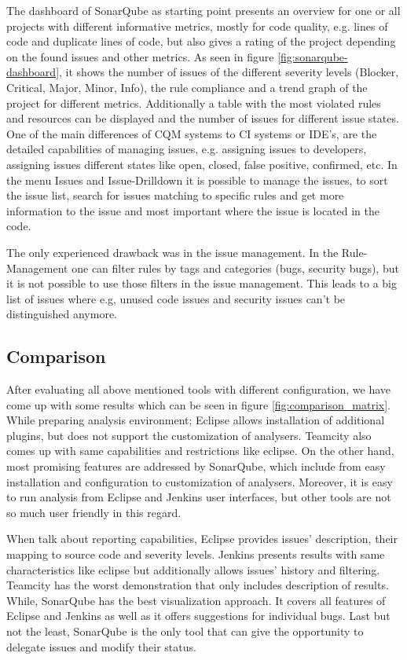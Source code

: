 \documentclass[conference]{IEEEtran}
\begin{document}
The dashboard of SonarQube as starting point presents an overview for one or all projects with different informative metrics, mostly for code quality, e.g. lines of code and duplicate lines of code, but also gives a rating of the project depending on the found issues and other metrics.
As seen in figure \ref{fig:sonarqube-dashboard}, it shows the number of issues of the different severity levels (Blocker, Critical, Major, Minor, Info), the rule compliance and a trend graph of the project for different metrics.
Additionally a table with the most violated rules and resources can be displayed and the number of issues for different issue states.
One of the main differences of CQM systems to CI systems or IDE's, are the detailed capabilities of managing issues, e.g. assigning issues to developers, assigning issues different states like open, closed, false positive, confirmed, etc. 
In the menu Issues and Issue-Drilldown it is possible to manage the issues, to sort the issue list, search for issues matching to specific rules and get more information to the issue and most important where the issue is located in the code.


The only experienced drawback was in the issue management.
In the Rule-Management one can filter rules by tags and categories (bugs, security bugs), but it is not possible to use those filters in the issue management. 
This leads to a big list of issues where e.g, unused code issues and security issues can't be distinguished anymore.



\subsection{Comparison}
\label{subsec:comparation}

After evaluating all above mentioned tools with different configuration, we have come up with some results which can be seen in figure \ref{fig:comparison_matrix}. While preparing analysis environment; Eclipse allows installation of additional plugins, but does not support the customization of analysers. Teamcity also comes up with same capabilities and restrictions like eclipse. On the other hand, most promising features are addressed by SonarQube, which include from easy installation and configuration to customization of analysers. Moreover, it is easy to run analysis from Eclipse and Jenkins user interfaces, but other tools are not so much user friendly in this regard.

When talk about reporting capabilities, Eclipse provides issues' description, their mapping to source code and severity levels. Jenkins presents results with same characteristics like eclipse but additionally allows issues' history and filtering. Teamcity has the worst demonstration that only includes description of results. While, SonarQube has the best visualization approach. It covers all features of Eclipse and Jenkins as well as it offers suggestions for individual bugs. Last but not the least, SonarQube is the only tool that can give the opportunity to delegate issues and modify their status.
\end{document}
